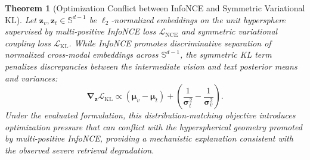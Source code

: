 \documentclass[10pt,journal,final]{IEEEtran}
\newtheorem{theorem}{Theorem}
\begin{document}
\begin{theorem}[Optimization Conflict between InfoNCE and Symmetric Variational KL]
\label{thm:gradient_conflict}
Let $\mathbf{z}_v, \mathbf{z}_t \in \mathbb{S}^{d-1}$ be $\ell_2$-normalized embeddings on the unit hypersphere supervised by multi-positive InfoNCE loss $\mathcal{L}_{\mathrm{NCE}}$ and symmetric variational coupling loss $\mathcal{L}_{\mathrm{KL}}$. While InfoNCE promotes discriminative separation of normalized cross-modal embeddings across $\mathbb{S}^{d-1}$, the symmetric KL term penalizes discrepancies between the intermediate vision and text posterior means and variances:
\begin{equation}
\label{eq:kl_gradient}
\boldsymbol{\nabla}_{\mathbf{z}} \mathcal{L}_{\mathrm{KL}} \propto (\boldsymbol{\mu}_v - \boldsymbol{\mu}_t) + \left( \frac{1}{\boldsymbol{\sigma}_t^2} - \frac{1}{\boldsymbol{\sigma}_v^2} \right).
\end{equation}
Under the evaluated formulation, this distribution-matching objective introduces optimization pressure that can conflict with the hyperspherical geometry promoted by multi-positive InfoNCE, providing a mechanistic explanation consistent with the observed severe retrieval degradation.
\end{theorem}
\end{document}
